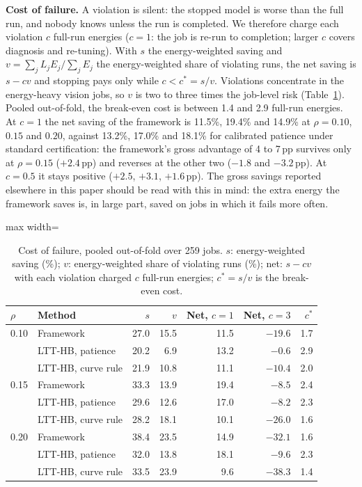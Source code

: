 \documentclass[3p,twocolumn,10pt]{elsarticle}
\theoremstyle{definition}
\begin{document}
\textbf{Cost of failure.} A violation is silent: the stopped model is worse than the full run, and nobody knows unless the run is completed. We therefore charge each violation $c$ full-run energies ($c=1$: the job is re-run to completion; larger $c$ covers diagnosis and re-tuning). With $s$ the energy-weighted saving and $v=\sum_jL_jE_j/\sum_jE_j$ the energy-weighted share of violating runs, the net saving is $s-cv$ and stopping pays only while $c<c^\ast=s/v$. Violations concentrate in the energy-heavy vision jobs, so $v$ is two to three times the job-level risk (Table~\ref{tab:cost}). Pooled out-of-fold, the break-even cost is between 1.4 and 2.9 full-run energies. At $c=1$ the net saving of the framework is 11.5\%, 19.4\% and 14.9\% at $\rho=0.10$, $0.15$ and $0.20$, against 13.2\%, 17.0\% and 18.1\% for calibrated patience under standard certification: the framework's gross advantage of 4 to 7\,pp survives only at $\rho=0.15$ ($+2.4$\,pp) and reverses at the other two ($-1.8$ and $-3.2$\,pp). At $c=0.5$ it stays positive ($+2.5$, $+3.1$, $+1.6$\,pp). The gross savings reported elsewhere in this paper should be read with this in mind: the extra energy the framework saves is, in large part, saved on jobs in which it fails more often.

\begin{table}[t]
\centering
\caption{Cost of failure, pooled out-of-fold over 259 jobs. $s$: energy-weighted saving (\%); $v$: energy-weighted share of violating runs (\%); net: $s-cv$ with each violation charged $c$ full-run energies; $c^\ast=s/v$ is the break-even cost.}
\label{tab:cost}
\footnotesize
\begin{adjustbox}{max width=\columnwidth}
\begin{tabular}{llrrrrr}
\toprule
$\rho$ & Method & $s$ & $v$ & Net, $c{=}1$ & Net, $c{=}3$ & $c^\ast$ \\
\midrule
0.10 & Framework & 27.0 & 15.5 & 11.5 & $-19.6$ & 1.7 \\
 & LTT-HB, patience & 20.2 & 6.9 & 13.2 & $-0.6$ & 2.9 \\
 & LTT-HB, curve rule & 21.9 & 10.8 & 11.1 & $-10.4$ & 2.0 \\
\midrule
0.15 & Framework & 33.3 & 13.9 & 19.4 & $-8.5$ & 2.4 \\
 & LTT-HB, patience & 29.6 & 12.6 & 17.0 & $-8.2$ & 2.3 \\
 & LTT-HB, curve rule & 28.2 & 18.1 & 10.1 & $-26.0$ & 1.6 \\
\midrule
0.20 & Framework & 38.4 & 23.5 & 14.9 & $-32.1$ & 1.6 \\
 & LTT-HB, patience & 32.0 & 13.8 & 18.1 & $-9.6$ & 2.3 \\
 & LTT-HB, curve rule & 33.5 & 23.9 & 9.6 & $-38.3$ & 1.4 \\
\bottomrule
\end{tabular}
\end{adjustbox}
\end{table}
\end{document}
